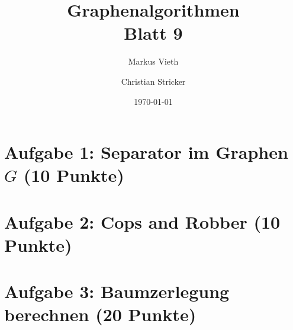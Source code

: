 \documentclass[a4paper,11pt,twoside]{scrartcl}
\title{Graphenalgorithmen\\ Blatt 9}
\author{Markus Vieth\and Christian Stricker}
\date{\today}
\begin{document}
\maketitle
\cleardoublepage
\pagestyle{myheadings}

\newpage
\section{Aufgabe 1: Separator im Graphen $G$ (10 Punkte)}
\section{Aufgabe 2: Cops and Robber (10 Punkte)}
\section{Aufgabe 3: Baumzerlegung berechnen (20 Punkte)}
\end{document}

